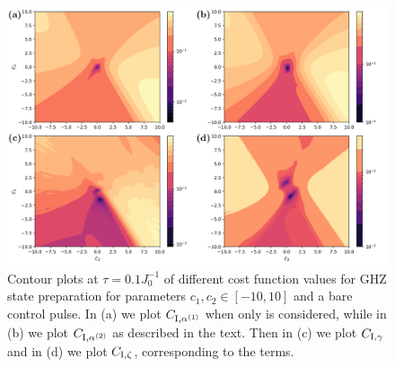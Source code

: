 \begin{figure}[t!]
    \centering
    \includegraphics[width=0.9\linewidth]{images/final_plot_int_nogrape.png} \caption[Contour plots of cost function landscapes for GHZ state preparation in frustrated spin systems (integral cost function) using a bare optimisation pulse.]{Contour plots at $\tau = 0.1 J_0^{-1}$ of different cost function values for GHZ state preparation for parameters $c_1, c_2 \in [-10,10]$ and a bare control pulse. In (a) we plot $C_{\rm I, \alpha^{(1)}}$ when only   is considered, while in (b) we plot $C_{\rm I, \alpha^{(2)}}$ as described in the text. Then in (c) we plot $C_{\rm I, \gamma}$ and in (d) we plot $C_{\rm I, \zeta}$, corresponding to the  terms.}\label{fig:ghz_contours_int_noGRAPE}
\end{figure}
